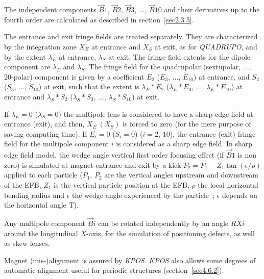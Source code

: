 {\noindent The independent components $ \vec  B1$, $\vec  B2$, $\vec  B3$, ..., 
$ \vec  B10 $  and their derivatives up to the fourth order are calculated as described in 
 section~\ref{sec2.3.5}.  

\medskip

\noindent The entrance and exit fringe fields are treated separately.  They
are characterized by the integration zone $ X_E $ at entrance and $ X_S $ at exit,
as for \textsl{QUADRUPO}, and by the extent $ \lambda_ E $ at entrance, 
$\lambda_ S $ at exit. The fringe field extents for the dipole component are $ \lambda_ E $ 
and $ \lambda_ S $. The fringe field for the quadrupolar 
(sextupolar,  ..., 20-polar) component is given by a coefficient $ E_2 $ 
 ($E_3$, ..., $E_{10}$)  at entrance, and 
$ S_2 $ ($ S_3$, ..., $S_{10}$)  at exit, such that the extent is $ \lambda_ E\ast E_2$
 ($\lambda_ E\ast E_3$, ..., $\lambda_ E\ast E_{10}$)  at 
entrance and $ \lambda_ S\ast S_2 $  ($\lambda_ S\ast S_3$, ..., $\lambda_ S\ast S_{10}$)  
at exit. 
\medskip

\noindent If $ \lambda_ E=0 $  ($\lambda_ S=0$)  the multipole lens is
considered to have a sharp edge field at entrance (exit), and then, $ X_E \ (X_S) $ is forced to zero 
(for the mere purpose of saving computing time).  If $ E_i=0 $  ($S_i=0$) ($i=2,\, 10$), the entrance (exit) fringe field for 
 the multipole component $ i $ is considered as a sharp edge field.  
In sharp edge field model, the wedge angle vertical first order focusing effect (if $\vec  B1$ is non zero) is simulated at magnet entrance and exit  by a kick $P_2 = P_1 - Z_1 \tan (\epsilon / \rho)$ applied to each particle ($P_1$, $P_2$ are the vertical angles upstream and downstream of the EFB, $Z_1$ is the vertical particle position at the EFB, $\rho$ the local horizontal bending radius and $\epsilon$ the wedge angle experienced by the particle~; $\epsilon$ depends on the horizontal angle T). 

\medskip

\noindent Any multipole component $ \vec  Bi $ can be rotated independently
by an angle $ RXi $ around the longitudinal $ X$-axis, for the simulation of positioning defects,
as well as skew lenses. 

\medskip

\noindent Magnet (mis-)alignment is assured by \textsl{KPOS}. 
\textsl{KPOS} also  allows some degrees of automatic alignment useful for periodic structures (section~\ref{sec4.6.2}).



}
